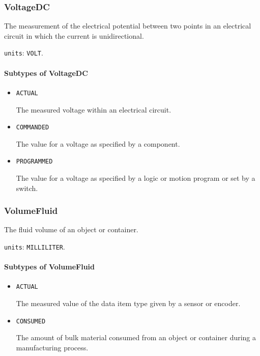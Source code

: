\subsubsection{VoltageDC}
\label{sec:VoltageDC}



The measurement of the electrical potential between two points in an electrical circuit in which the current is unidirectional.


\texttt{units}: \texttt{VOLT}.

\paragraph{Subtypes of VoltageDC}\mbox{}
\label{sec:Subtypes of VoltageDC}

\begin{itemize}

\item \texttt{ACTUAL}


The measured voltage within an electrical circuit.

\item \texttt{COMMANDED}


The value for a voltage as specified by a  component.

\item \texttt{PROGRAMMED}


The value for a voltage as specified by a logic or motion program or set by a switch.


\end{itemize}






\subsubsection{VolumeFluid}
\label{sec:VolumeFluid}



The fluid volume of an object or container.


\texttt{units}: \texttt{MILLILITER}.

\paragraph{Subtypes of VolumeFluid}\mbox{}
\label{sec:Subtypes of VolumeFluid}

\begin{itemize}

\item \texttt{ACTUAL}


The measured value of the data item type given by a sensor or encoder.

\item \texttt{CONSUMED}


The amount of bulk material consumed from an object or container during a manufacturing process.


\end{itemize}





